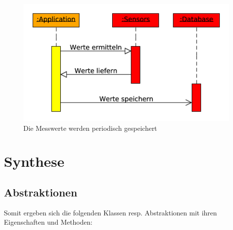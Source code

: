 \documentclass[
    10pt,
    a4paper,
]{scrartcl}
\begin{document}
\begin{figure}[ht]
    \centering
    \includegraphics[width=.7\textwidth]{sequence-store-periodic}
    \caption{Die Messwerte werden periodisch gespeichert}
    \label{fig:sequence-store-periodic}
\end{figure}

\section{Synthese}

\subsection{Abstraktionen}
Somit ergeben sich die folgenden Klassen resp. Abstraktionen mit ihren Eigenschaften und
Methoden:
\end{document}
